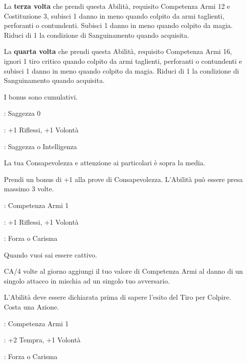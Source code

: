 \begin{multicols}{2}
La \textbf{terza volta} che prendi questa Abilità, requisito Competenza Armi 12 e Costituzione 3, subisci 1 danno in meno quando colpito da armi taglienti, perforanti o contundenti. Subisci 1 danno in meno quando colpito da magia. Riduci di 1 la condizione di Sanguinamento quando acquisita.

La \textbf{quarta volta} che prendi questa Abilità, requisito Competenza Armi 16, ignori 1 tiro critico quando colpito da armi taglienti, perforanti o contundenti e subisci 1 danno in meno quando colpito da magia. Riduci di 1 la condizione di Sanguinamento quando acquisita.

I bonus sono cumulativi.

\begin{description}[noitemsep, topsep=0pt, parsep=0pt, partopsep=0pt, leftmargin=0cm, labelwidth=2.5cm]
    \item[\textbf{Requisito}]: Saggezza 0
    \item[\textbf{Tiri Salvezza}]: +1 Riflessi, +1 Volontà
    \item[\textbf{Caratteristica}]: Saggezza o Intelligenza
\end{description}

La tua Consapevolezza e attenzione ai particolari è sopra la media.

Prendi un bonus di +1 alla prove di Consapevolezza. L'Abilità può essere presa massimo 3 volte.

\begin{description}[noitemsep, topsep=0pt, parsep=0pt, partopsep=0pt, leftmargin=0cm, labelwidth=2.5cm]
    \item[\textbf{Requisito}]: Competenza Armi 1
    \item[\textbf{Tiri Salvezza}]: +1 Riflessi, +1 Volontà
    \item[\textbf{Caratteristica}]: Forza o Carisma
\end{description}

Quando vuoi sai essere cattivo.

CA/4 volte al giorno aggiungi il tuo valore di Competenza Armi al danno di un singolo attacco in mischia ad un singolo tuo avversario.

L'Abilità deve essere dichiarata prima di sapere l'esito del Tiro per Colpire. Costa una Azione.

\begin{description}[noitemsep, topsep=0pt, parsep=0pt, partopsep=0pt, leftmargin=0cm, labelwidth=2.5cm]
    \item[\textbf{Requisito}]: Competenza Armi 1
    \item[\textbf{Tiri Salvezza}]: +2 Tempra, +1 Volontà
    \item[\textbf{Caratteristica}]: Forza o Carisma
\end{description}


\end{multicols}
